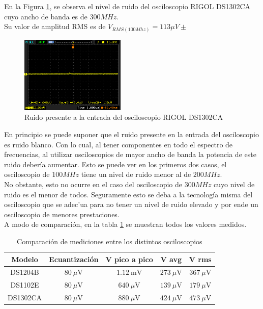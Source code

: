 \documentclass[a4paper,10pt]{article}
\begin{document}
	\indent En la Figura \ref{img007}, se observa el nivel de ruido del 
	osciloscopio RIGOL DS1302CA cuyo ancho de banda es de $300MHz$. \\
	\indent Su valor de amplitud RMS es de $V_{RMS(100Mhz)}=113\mu V \pm $	
		\begin{figure}[!htb]
			\centering
			\includegraphics[width=5cm]
			{Imagenes/Ruido300Mhz.png}
			\caption{Ruido presente a la entrada del osciloscopio RIGOL DS1302CA}
			\label{img007}
		\end{figure}
	\indent En principio se puede suponer que el ruido presente en la entrada 
	del osciloscopio es ruido blanco. Con lo cual, al tener componentes en todo 
	el espectro de frecuencias, al utilizar osciloscopios de mayor ancho de 
	banda la potencia de este ruido deber\'ia aumentar. Esto se puede ver en los
	primeros dos casos, el osciloscopio de $100MHz$ tiene un nivel de ruido 
	menor al de $200MHz$. \\
	\indent No obstante, esto no ocurre en el caso del osciloscopio de $300MHz$ 
	cuyo nivel de ruido es el menor de todos. Seguramente esto se deba a la 
	tecnolog\'ia misma del osciloscopio que se adec'ua para no tener un nivel de
	ruido elevado y por ende un osciloscopio de menores prestaciones. \\
	\indent A modo de comparación, en la tabla \ref{tab001} se muestran todos 
	los valores medidos.
	
	\begin{table}[!htp]
		\centering
		\begin{tabular}{|c|c|c|c|c|}
			\hline
    		Modelo & Ecuantización & V pico a pico& V avg & V rms \\
			\hline
			DS1204B & $80~\mu\text{V}$ & $1.12~\text{mV}$ & $273~\mu\text{V}$ 
			& $367~\mu\text{V}$ \\
			\hline 
			DS1102E & $80~\mu\text{V}$ & $640~\mu\text{V}$ &$139~\mu\text{V}$
			 & $179~\mu\text{V}$ \\
			\hline
			DS1302CA & $80~\mu\text{V}$ & $880~\mu\text{V}$ & 
			$424~\mu\text{V}$ & $473~\mu\text{V}$ \\
			\hline
		\end{tabular}
		\caption{Comparación de mediciones entre los distintos osciloscopios} 
		\label{tab001}
	\end{table}
			
\end{document}
